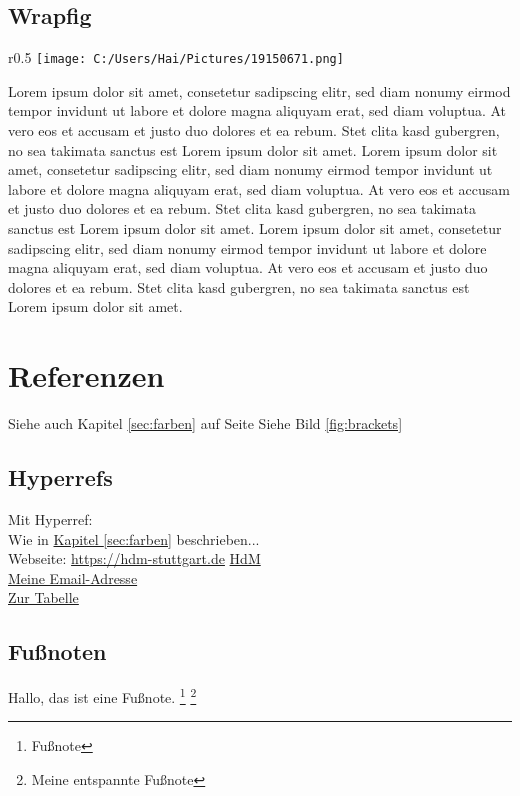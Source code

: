 \documentclass[a4paper, 12pt]{report}
\begin{document}
	\section{Wrapfig}
	\begin{wrapfigure}{r}{0.5\linewidth}
		\vspace{-16pt} %
		\centering
		\texttt{[image: C:/Users/Hai/Pictures/19150671.png]}
		\caption{Brackets}
		\label{fig:brackets}
	\end{wrapfigure}

	Lorem ipsum dolor sit amet, consetetur sadipscing elitr, sed diam nonumy eirmod tempor invidunt ut labore et dolore magna aliquyam erat, sed diam voluptua. At vero eos et accusam et justo duo dolores et ea rebum. Stet clita kasd gubergren, no sea takimata sanctus est Lorem ipsum dolor sit amet. Lorem ipsum dolor sit amet, consetetur sadipscing elitr, sed diam nonumy eirmod tempor invidunt ut labore et dolore magna aliquyam erat, sed diam voluptua. At vero eos et accusam et justo duo dolores et ea rebum. Stet clita kasd gubergren, no sea takimata sanctus est Lorem ipsum dolor sit amet. Lorem ipsum dolor sit amet, consetetur sadipscing elitr, sed diam nonumy eirmod tempor invidunt ut labore et dolore magna aliquyam erat, sed diam voluptua. At vero eos et accusam et justo duo dolores et ea rebum. Stet clita kasd gubergren, no sea takimata sanctus est Lorem ipsum dolor sit amet.	
	
	\chapter{Referenzen}
	
	Siehe auch Kapitel \ref{sec:farben} auf Seite \pageref{sec:farben}
	Siehe Bild \ref{fig:brackets}
	
	\section{Hyperrefs}
	Mit Hyperref:\\
	Wie in \hyperref[sec:farben]{Kapitel \ref{sec:farben}} beschrieben...	
	 \\
	Webseite: \url{https://hdm-stuttgart.de}
	\href{https://hdm-stuttgart.de}{HdM} \\
	\href{mailto:sv048@hdm-stuttgart.de}{Meine Email-Adresse} \\
	\hyperlink{tabelle1}{Zur Tabelle}
	
	\section{Fußnoten}
	Hallo, das ist eine Fußnote. \footnote{Fußnote}
	\let\thefootnote\relax\footnote{Meine entspannte Fußnote} %
	
\end{document}
